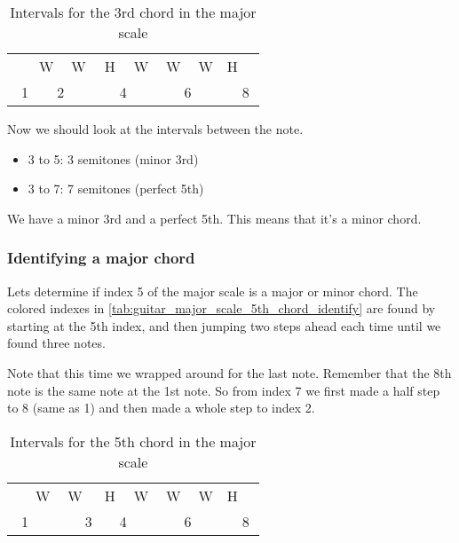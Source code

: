 \begin{table}[h]
	\centering
	\begin{tabular}{*{16}{c}}
		& \multicolumn{2}{P{4mm}}{\large{W}} & \multicolumn{2}{P{4mm}}{\large{W}} & \multicolumn{2}{P{4mm}}{\large{H}} & \multicolumn{2}{P{4mm}}{\large{W}} & \multicolumn{2}{P{4mm}}{\large{W}} & \multicolumn{2}{P{4mm}}{\large{W}} & \multicolumn{2}{P{4mm}}{\large{H}} & \\
		\multicolumn{2}{P{4mm}}{1} & \multicolumn{2}{P{4mm}}{2} & \multicolumn{2}{P{4mm}}{\ScaleRootCellFill 3} & \multicolumn{2}{P{4mm}}{4} & \multicolumn{2}{P{4mm}}{\ScaleCellFill 5} & \multicolumn{2}{P{4mm}}{6} & \multicolumn{2}{P{4mm}}{\ScaleCellFill 7} & \multicolumn{2}{P{4mm}}{8}
	\end{tabular}
	\caption{Intervals for the 3rd chord in the major scale}
	\label{tab:guitar_major_scale_3rd_chord_identify}
\end{table}

Now we should look at the intervals between the note.

\begin{itemize}
	\item 3 to 5: 3 semitones (minor 3rd)
	\item 3 to 7: 7 semitones (perfect 5th)
\end{itemize}

We have a minor 3rd and a perfect 5th. This means that it's a minor chord.

\subsubsection{Identifying a major chord}
Lets determine if index 5 of the major scale is a major or minor chord. The colored indexes in \autoref{tab:guitar_major_scale_5th_chord_identify} are found by starting at the 5th index, and then jumping two steps ahead each time until we found three notes.

Note that this time we wrapped around for the last note. Remember that the 8th note is the same note at the 1st note. So from index 7 we first made a half step to 8 (same as 1) and then made a whole step to index 2.

\begin{table}[h]
	\centering
	\begin{tabular}{*{16}{c}}
		& \multicolumn{2}{P{4mm}}{\large{W}} & \multicolumn{2}{P{4mm}}{\large{W}} & \multicolumn{2}{P{4mm}}{\large{H}} & \multicolumn{2}{P{4mm}}{\large{W}} & \multicolumn{2}{P{4mm}}{\large{W}} & \multicolumn{2}{P{4mm}}{\large{W}} & \multicolumn{2}{P{4mm}}{\large{H}} & \\
		\multicolumn{2}{P{4mm}}{1} & \multicolumn{2}{P{4mm}}{\ScaleCellFill 2} & \multicolumn{2}{P{4mm}}{3} & \multicolumn{2}{P{4mm}}{4} & \multicolumn{2}{P{4mm}}{\ScaleRootCellFill 5} & \multicolumn{2}{P{4mm}}{6} & \multicolumn{2}{P{4mm}}{\ScaleCellFill 7} & \multicolumn{2}{P{4mm}}{8}
	\end{tabular}
	\caption{Intervals for the 5th chord in the major scale}
	\label{tab:guitar_major_scale_5th_chord_identify}
\end{table}

